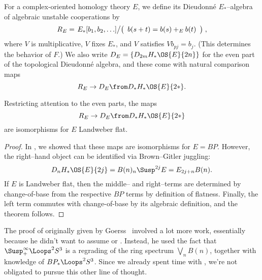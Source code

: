 \begin{example}
For a complex-oriented homology theory $E$, we define its Dieudonn\'e $E_*$--algebra of algebraic unstable cooperations by \[R_E = \left. E_*[b_1, b_2, \ldots] \middle/ \left( \begin{array}{c} b(s+t) = b(s) +_E b(t) \end{array} \right) \right.,\] where $V$ is multiplicative, $V$ fixes $E_*$, and $V$ satisfies $Vb_{pj} = b_j$.  (This determines the behavior of $F$.)  We also write $D_E = \{D_{2m} H_* \OS{E}{2n}\}$ for the even part of the topological Dieudonn\'e algebra, and these come with natural comparison maps \[R_E \to D_E \from D_* H_* \OS{E}{2*}.\]
\end{example}

\begin{theorem}\label{LandweberFlatUnstableCoopns}
Restricting attention to the even parts, the maps \[R_E \to D_E \from D_* H_* \OS{E}{2*}\] are isomorphisms for $E$ Landweber flat.
\end{theorem}
\begin{proof}
In , we showed that these maps are isomorphisms for $E = BP$.  However, the right--hand object can be identified via Brown--Gitler juggling: \[D_n H_* \OS{E}{2j} = B(n)_n \Susp^{2j} E = E_{2j+n} B(n).\]  If $E$ is Landweber flat, then the middle-- and right--terms are determined by change-of-base from the respective $BP$ terms by definition of flatness.  Finally, the left term commutes with change-of-base by its algebraic definition, and the theorem follows.
\end{proof}

\begin{remark}
The proof of  originally given by Goerss~\cite{GoerssDieudonne} involved a lot more work, essentially because he didn't want to assume  or .  Instead, he used the fact that $\Susp^\infty_+ \Loops^2 S^3$ is a regrading of the ring spectrum $\bigvee_n B(n)$, together with knowledge of $BP_* \Loops^2 S^3$.  Since we already spent time with , we're not obligated to pursue this other line of thought.
\end{remark}

